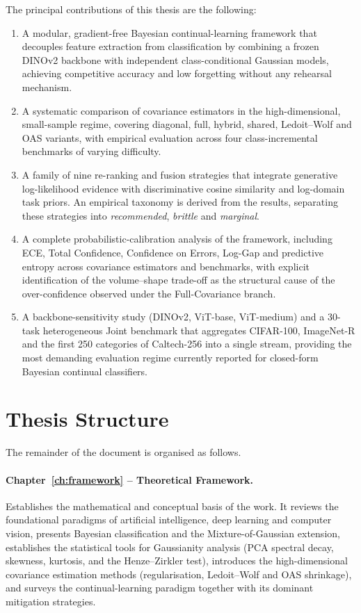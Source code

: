 The principal contributions of this thesis are the following:
\begin{enumerate}
	\item A modular, gradient-free Bayesian continual-learning framework that decouples feature extraction from classification by combining a frozen DINOv2 backbone with independent class-conditional Gaussian models, achieving competitive accuracy and low forgetting without any rehearsal mechanism.
	\item A systematic comparison of covariance estimators in the high-dimensional, small-sample regime, covering diagonal, full, hybrid, shared, Ledoit--Wolf and OAS variants, with empirical evaluation across four class-incremental benchmarks of varying difficulty.
	\item A family of nine re-ranking and fusion strategies that integrate generative log-likelihood evidence with discriminative cosine similarity and log-domain task priors. An empirical taxonomy is derived from the results, separating these strategies into \emph{recommended}, \emph{brittle} and \emph{marginal}.
	\item A complete probabilistic-calibration analysis of the framework, including ECE, Total Confidence, Confidence on Errors, Log-Gap and predictive entropy across covariance estimators and benchmarks, with explicit identification of the volume--shape trade-off as the structural cause of the over-confidence observed under the Full-Covariance branch.
	\item A backbone-sensitivity study (DINOv2, ViT-base, ViT-medium) and a 30-task heterogeneous Joint benchmark that aggregates CIFAR-100, ImageNet-R and the first 250 categories of Caltech-256 into a single stream, providing the most demanding evaluation regime currently reported for closed-form Bayesian continual classifiers.
\end{enumerate}

\section{Thesis Structure}

The remainder of the document is organised as follows.

\paragraph{Chapter~\ref{ch:framework} -- Theoretical Framework.}
Establishes the mathematical and conceptual basis of the work. It reviews the foundational paradigms of artificial intelligence, deep learning and computer vision, presents Bayesian classification and the Mixture-of-Gaussian extension, establishes the statistical tools for Gaussianity analysis (PCA spectral decay, skewness, kurtosis, and the Henze--Zirkler test), introduces the high-dimensional covariance estimation methods (regularisation, Ledoit--Wolf and OAS shrinkage), and surveys the continual-learning paradigm together with its dominant mitigation strategies.

